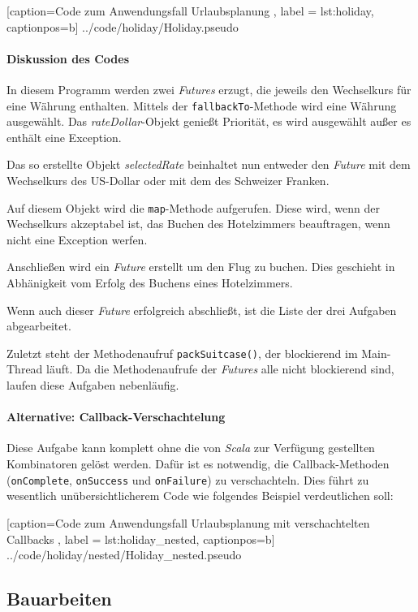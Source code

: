 
    [caption={Code zum Anwendungsfall \glqq Urlaubsplanung\grqq{} },
       label = lst:holiday,
       captionpos=b]
 {../code/holiday/Holiday.pseudo}
 
\paragraph{Diskussion des Codes}

In diesem Programm werden zwei \emph{Futures} erzugt, die jeweils
den Wechselkurs für eine Währung enthalten. Mittels der
\texttt{fallbackTo}-Methode wird eine Währung ausgewählt.
Das \emph{rateDollar}-Objekt genießt Priorität, es wird ausgewählt
außer es enthält eine Exception.

Das so erstellte Objekt \emph{selectedRate} beinhaltet nun entweder
den \emph{Future} mit dem Wechselkurs des US-Dollar oder mit dem des
Schweizer Franken.

Auf diesem Objekt wird die \texttt{map}-Methode aufgerufen. Diese wird,
wenn der Wechselkurs akzeptabel ist, das Buchen des Hotelzimmers beauftragen,
wenn nicht eine Exception werfen.

Anschließen wird ein \emph{Future} erstellt um den Flug zu buchen. Dies
geschieht in Abhänigkeit vom Erfolg des Buchens eines Hotelzimmers.

Wenn auch dieser \emph{Future} erfolgreich abschließt, ist die
Liste der drei Aufgaben abgearbeitet.

Zuletzt steht der Methodenaufruf \texttt{packSuitcase()}, der blockierend
im Main-Thread läuft. Da die Methodenaufrufe der \emph{Futures} alle
nicht blockierend sind, laufen diese Aufgaben nebenläufig.

\paragraph{Alternative: Callback-Verschachtelung} Diese Aufgabe kann
komplett ohne die von \emph{Scala} zur Verfügung gestellten
Kombinatoren gelöst werden. Dafür ist es notwendig, die Callback-Methoden
(\texttt{onComplete}, \texttt{onSuccess} und \texttt{onFailure}) zu
verschachteln. Dies führt zu wesentlich unübersichtlicherem Code
wie folgendes Beispiel verdeutlichen soll:


    [caption={Code zum Anwendungsfall \glqq Urlaubsplanung\grqq{} mit verschachtelten Callbacks },
       label = lst:holiday_nested,
       captionpos=b]
 {../code/holiday/nested/Holiday_nested.pseudo}

\subsection{Bauarbeiten}

